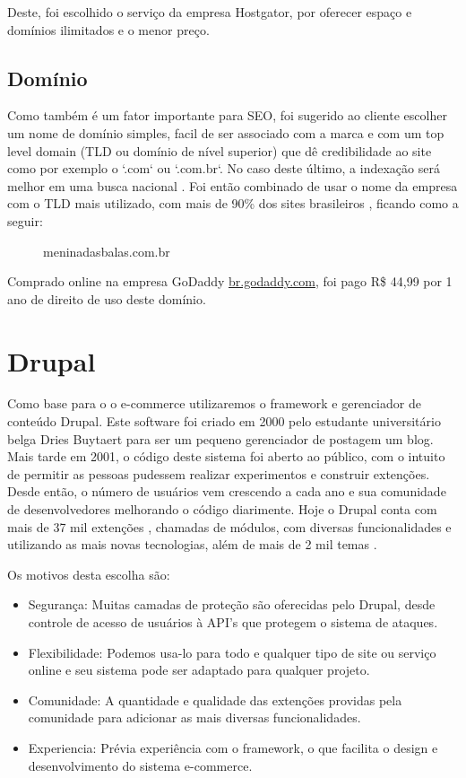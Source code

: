 \documentclass[
	12pt,				%
    oneside,			%
	a4paper,			%
	english,			%
	french,				%
	spanish,			%
	brazil				%
	]{abntex2}
\begin{document}
Deste, foi escolhido o serviço da empresa Hostgator, por oferecer espaço e domínios ilimitados e o menor preço.

\subsection{Domínio}
Como também é um fator importante para SEO, foi sugerido ao cliente escolher um nome de domínio simples, facil de ser associado com a marca e com um top level domain (TLD ou domínio de nível superior) que dê credibilidade ao site como por exemplo o `.com` ou `.com.br`. No caso deste último, a indexação será melhor em uma busca nacional \cite{TLD}. Foi então combinado de usar o nome da empresa com o TLD mais utilizado, com mais de 90\% dos sites brasileiros \cite{RegistroBr}, ficando como a seguir:

\begin{figure}
  \centering
    \large
    meninadasbalas.com.br
\end{figure}

Comprado online na empresa GoDaddy \url{br.godaddy.com}, foi pago R\$ 44,99 por 1 ano de direito de uso deste domínio.

\section{Drupal}

Como base para o o e-commerce utilizaremos o framework e gerenciador de conteúdo Drupal.  Este software foi criado em 2000 pelo estudante universitário belga Dries Buytaert para ser um pequeno gerenciador de postagem um blog. Mais tarde em 2001, o código deste sistema foi aberto ao público, com o intuito de permitir as pessoas pudessem realizar experimentos e construir extenções. Desde então, o número de usuários vem crescendo a cada ano e sua comunidade de desenvolvedores melhorando o código diarimente. Hoje o Drupal conta com mais de 37 mil extenções \cite{DrupalModules}, chamadas de módulos, com diversas funcionalidades e utilizando as mais novas tecnologias, além de mais de 2 mil temas \cite{DrupalTheme}.

Os motivos desta escolha são:

\begin{itemize}
  \item Segurança: Muitas camadas de proteção são oferecidas pelo Drupal, desde controle de acesso de usuários à API's que protegem o sistema de ataques.
  \item Flexibilidade: Podemos usa-lo para todo e qualquer tipo de site ou serviço online e seu sistema pode ser adaptado para qualquer projeto.
  \item Comunidade: A quantidade e qualidade das extenções providas pela comunidade para adicionar as mais diversas funcionalidades.
  \item Experiencia: Prévia experiência com o framework, o que facilita o design e desenvolvimento do sistema e-commerce.
\end{itemize}
\end{document}
